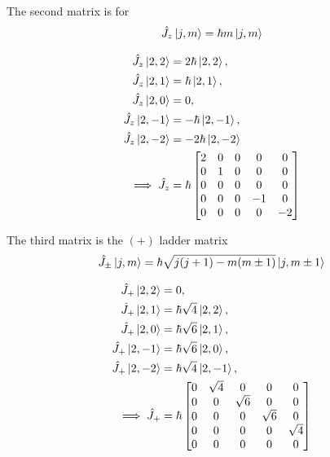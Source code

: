 \documentclass[letter, 10pts]{article}
\newcommand{\hb}{\hbar}
\begin{document}
The second matrix is for 
\[
\hat{J}_z \ket{j,m} = \hb m \ket{j,m}
\] 

\begin{align*}
	\hat{J}_z \ket{2,2} &= 2\hbar \ket{2,2}, \\
\hat{J}_z \ket{2,1} &= \hbar \ket{2,1}, \\
\hat{J}_z \ket{2,0} &= 0, \\
\hat{J}_z \ket{2,-1} &= -\hbar \ket{2,-1}, \\
\hat{J}_z \ket{2,-2} &= -2\hbar \ket{2,-2} \\ \implies 
\hat{J}_z &= 
\hb 
\begin{bmatrix}
2 & 0 & 0 & 0 & 0 \\
0 & 1 & 0 & 0 & 0 \\
0 & 0 & 0 & 0 & 0 \\
0 & 0 & 0 & -1 & 0 \\
0 & 0 & 0 & 0 & -2
\end{bmatrix} 
\end{align*}

The third matrix is the $(+)$ ladder matrix 
\[
\hat{J}_\pm \ket{j,m} = \hb 
\sqrt{j (j+1) - m (m\pm 1) } 
\ket{j, m \pm 1}
\] 

\begin{align*}
\hat{J}_+ \ket{2,2} &= 0, \\
\hat{J}_+ \ket{2,1} &= \hbar \sqrt{4} \ket{2,2}, \\
\hat{J}_+ \ket{2,0} &= \hbar \sqrt{6} \ket{2,1}, \\
\hat{J}_+ \ket{2,-1} &= \hbar \sqrt{6} \ket{2,0}, \\
\hat{J}_+ \ket{2,-2} &= \hbar \sqrt{4} \ket{2,-1}, \\
\implies \hat{J}_+ &=  \hb
\begin{bmatrix}
0 &  \sqrt{4} & 0 & 0 & 0 \\
0 & 0 & \sqrt{6} & 0 & 0 \\
0 & 0 & 0 & \sqrt{6} & 0 \\
0 & 0 & 0 & 0 & \sqrt{4} \\
0 & 0 & 0 & 0 & 0
\end{bmatrix}
\end{align*}
\end{document}
